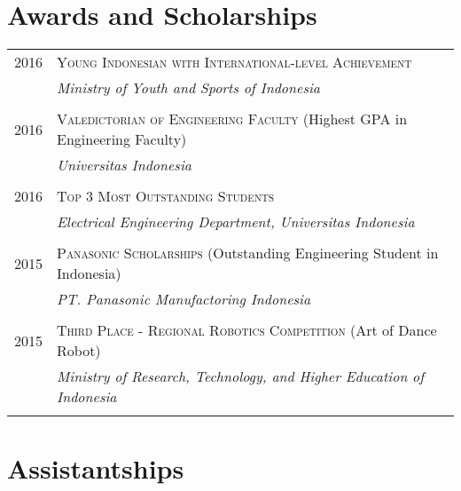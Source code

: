 \documentclass[a4paper,10pt]{article} %
\begin{document}

\section{Awards and Scholarships}

\begin{tabular}{r|p{12cm}}
\textsc{2016} & \textsc{Young Indonesian with International-level Achievement}\\
& \emph{Ministry of Youth and Sports of Indonesia}\\ 
\multicolumn{2}{c}{} \\

\textsc{2016} & \textsc{Valedictorian of Engineering Faculty} (Highest GPA in Engineering Faculty)\\
& \emph{Universitas Indonesia}\\ 
\multicolumn{2}{c}{} \\

\textsc{2016} & \textsc{Top 3 Most Outstanding Students}\\
& \emph{Electrical Engineering Department, Universitas Indonesia}\\ 
\multicolumn{2}{c}{} \\

\textsc{2015} & \textsc{Panasonic Scholarships} (Outstanding Engineering Student in Indonesia)\\
& \emph{PT. Panasonic Manufactoring Indonesia}\\ 
\multicolumn{2}{c}{} \\

\textsc{2015} & \textsc{Third Place - Regional Robotics Competition} (Art of Dance Robot)\\
& \emph{Ministry of Research, Technology, and Higher Education of Indonesia}\\ 
\multicolumn{2}{c}{} \\

\end{tabular}

\vspace{-3mm}
\section{Assistantships}
\end{document}
